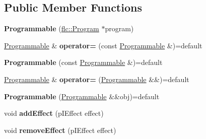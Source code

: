 \subsection*{Public Member Functions}
\begin{DoxyCompactItemize}
\item 
\mbox{\label{classflw_1_1flf_1_1Programmable_a15a01f84dd1e918fc3fb27fc679e4f72}} 
{\bfseries Programmable} (\hyperlink{classflw_1_1flc_1_1Program}{flc\+::\+Program} $\ast$program)
\item 
\mbox{\label{classflw_1_1flf_1_1Programmable_a94afe615698e45de4622bfbe6ed0f29f}} 
\hyperlink{classflw_1_1flf_1_1Programmable}{Programmable} \& {\bfseries operator=} (const \hyperlink{classflw_1_1flf_1_1Programmable}{Programmable} \&)=default
\item 
\mbox{\label{classflw_1_1flf_1_1Programmable_a4662d11c4fb5a887ef4d973acaea2d97}} 
{\bfseries Programmable} (const \hyperlink{classflw_1_1flf_1_1Programmable}{Programmable} \&)=default
\item 
\mbox{\label{classflw_1_1flf_1_1Programmable_a23caca5944c7b6a88601ca016349564b}} 
\hyperlink{classflw_1_1flf_1_1Programmable}{Programmable} \& {\bfseries operator=} (\hyperlink{classflw_1_1flf_1_1Programmable}{Programmable} \&\&)=default
\item 
\mbox{\label{classflw_1_1flf_1_1Programmable_a51e65f68660ff6402694d6720e62296b}} 
{\bfseries Programmable} (\hyperlink{classflw_1_1flf_1_1Programmable}{Programmable} \&\&obj)=default
\item 
\mbox{\label{classflw_1_1flf_1_1Programmable_a30b5fd3b8d68e75ab0a0bdcaa2bc0100}} 
void {\bfseries add\+Effect} (p\+I\+Effect effect)
\item 
\mbox{\label{classflw_1_1flf_1_1Programmable_a17959aba99a55f54931892437c39f58c}} 
void {\bfseries remove\+Effect} (p\+I\+Effect effect)
\item 
\mbox{\label{classflw_1_1flf_1_1Programmable_a4a0b0364f2bc52f8c72afdb56a329f01}} 

\end{DoxyCompactItemize}
